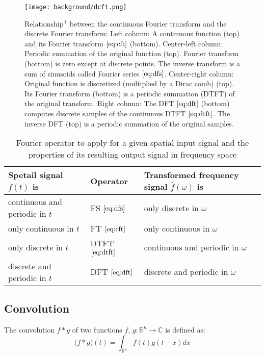 \begin{figure}[H]
  \centering
  \texttt{[image: background/dcft.png]}
  \caption[]{Relationship$\footnotemark$ between the continuous Fourier transform and the discrete Fourier transform: Left column: A continuous function (top) and its Fourier transform $\ref{eq:cft}$ (bottom). Center-left column: Periodic summation of the original function (top). Fourier transform (bottom) is zero except at discrete points. The inverse transform is a sum of sinusoids called Fourier series $\ref{eq:dfs}$. Center-right column: Original function is discretized (multiplied by a Dirac comb) (top). Its Fourier transform (bottom) is a periodic summation (DTFT) of the original transform. Right column: The DFT $\ref{eq:dft}$ (bottom) computes discrete samples of the continuous DTFT $\ref{eq:dtft}$. The inverse DFT (top) is a periodic summation of the original samples.}
\label{fig:contdiscft}
\end{figure}

\begin{table}[H]
    \begin{tabular}{l|l|l}
    \hline
    Spetail signal $f(t)$ is & Operator & Transformed frequency signal $\hat{f}(\omega)$ is\\
    \hline
    continuous and periodic in $t$ & FS $\ref{eq:dfs}$ & only discrete in $\omega$ \\
    only continuous in $t$ & FT $\ref{eq:cft}$ & only continuous in $\omega$\\
    only discrete in $t$ & DTFT $\ref{eq:dtft}$ & continuous and periodic in $\omega$\\
    discrete and periodic in $t$ & DFT $\ref{eq:dft}$ & discrete and periodic in $\omega$\\
    \hline
    \end{tabular}
\caption{Fourier operator to apply for a given spatial input signal and the properties of its resulting output signal in frequency space}
\label{tab:ftoperatorsdependencies}
\end{table}

\subsection{Convolution}
The convolution $f*g$ of two functions $f$, $g$$\colon \mathds{R}^n \to \mathds{C} $ is defined as:  
\begin{equation}
  \mathcal (f*g)(t) = \int_{\mathds{R}^n} f(t)g(t-x) dx
  \label{eq:convolution}
\end{equation}

